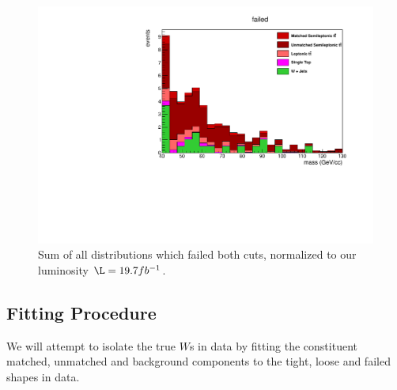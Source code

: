 \begin{figure}[ht!]
\centering
\includegraphics[scale=0.66]{figs/WtagSF/TOTAL_FAIL.pdf}
\caption{Sum of all distributions which failed both cuts, normalized to our luminosity $\L = 19.7 fb^{-1}$. }\label{fig:failedHIST}
\end{figure}
\subsection{Fitting Procedure}
We will attempt to isolate the true $W$s in data by fitting the constituent matched, unmatched and background components to the tight, loose and failed shapes in data.
